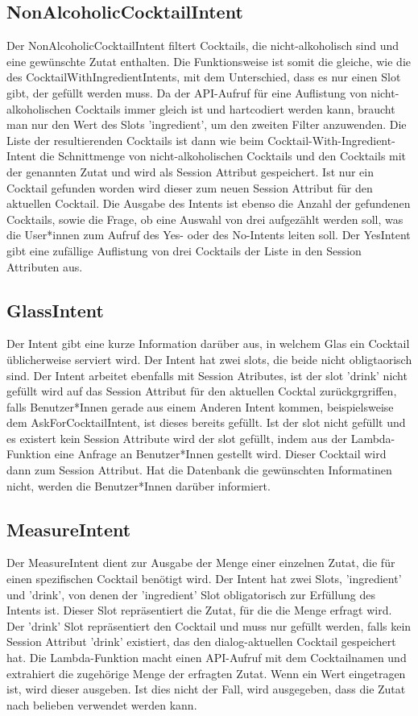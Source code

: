 \documentclass[12pt,letterpaper]{article}
\begin{document}
\subsection{NonAlcoholicCocktailIntent}
Der NonAlcoholicCocktailIntent filtert Cocktails, die nicht-alkoholisch sind und eine gewünschte Zutat enthalten. Die Funktionsweise ist somit die gleiche, wie die des CocktailWithIngredientIntents, mit dem Unterschied, dass es nur einen Slot gibt, der gefüllt werden muss. Da der API-Aufruf für eine Auflistung von nicht-alkoholischen Cocktails immer gleich ist und hartcodiert werden kann, braucht man nur den Wert des Slots 'ingredient', um den zweiten Filter anzuwenden. Die Liste der resultierenden Cocktails ist dann wie beim Cocktail-With-Ingredient-Intent die Schnittmenge von nicht-alkoholischen Cocktails und den Cocktails mit der genannten Zutat und wird als Session Attribut gespeichert. Ist nur ein Cocktail gefunden worden wird dieser zum neuen Session Attribut für den aktuellen Cocktail. Die Ausgabe des Intents ist ebenso die Anzahl der gefundenen Cocktails, sowie die Frage, ob eine Auswahl von drei aufgezählt werden soll, was die User*innen zum Aufruf des Yes- oder des No-Intents leiten soll. Der YesIntent gibt eine zufällige Auflistung von drei Cocktails der Liste in den Session Attributen aus.
\subsection{GlassIntent}
Der Intent gibt eine kurze Information darüber aus, in welchem Glas ein Cocktail üblicherweise serviert wird. Der Intent hat zwei slots, die beide nicht obligtaorisch sind. Der Intent arbeitet ebenfalls mit Session Atributes, ist der slot 'drink' nicht gefüllt wird auf das Session Attribut für den aktuellen Cocktal zurückgrgriffen, falls Benutzer*Innen gerade aus einem Anderen Intent kommen, beispielsweise dem AskForCocktailIntent, ist dieses bereits gefüllt. Ist der slot nicht gefüllt und es existert kein Session Attribute wird der slot gefüllt, indem aus der Lambda-Funktion eine Anfrage an Benutzer*Innen gestellt wird. Dieser Cocktail wird dann zum Session Attribut. Hat die Datenbank die gewünschten Informatinen nicht, werden die Benutzer*Innen darüber informiert.
\subsection{MeasureIntent}
Der MeasureIntent dient zur Ausgabe der Menge einer einzelnen Zutat, die für einen spezifischen Cocktail benötigt wird.
Der Intent hat zwei Slots, 'ingredient' und 'drink', von denen der 'ingredient' Slot obligatorisch zur Erfüllung des Intents ist. 
Dieser Slot repräsentiert die Zutat, für die die Menge erfragt wird. Der 'drink' Slot repräsentiert den Cocktail und muss nur gefüllt werden,
falls kein Session Attribut 'drink' existiert, das den dialog-aktuellen Cocktail gespeichert hat.
Die Lambda-Funktion macht einen API-Aufruf mit dem Cocktailnamen und extrahiert die zugehörige Menge der erfragten Zutat.
Wenn ein Wert eingetragen ist, wird dieser ausgeben. Ist dies nicht der Fall, wird ausgegeben, dass die Zutat nach belieben verwendet werden kann.
\end{document}

